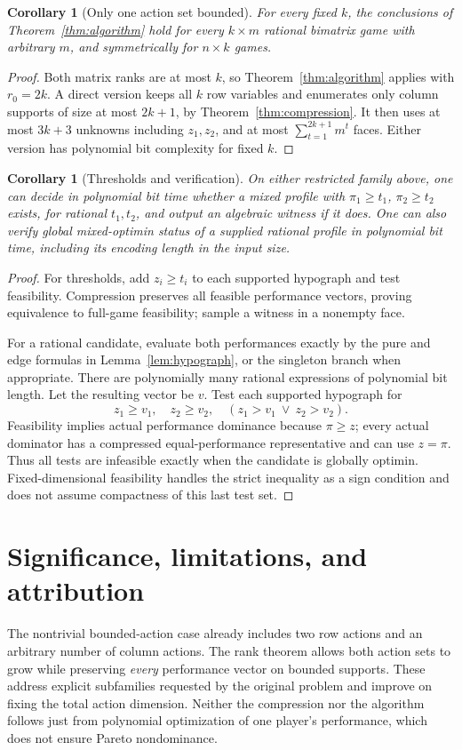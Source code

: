 \documentclass[11pt]{article}
\newtheorem{corollary}[theorem]{Corollary}
\theoremstyle{remark}
\begin{document}
\begin{corollary}[Only one action set bounded]\label{cor:one-side}
For every fixed $k$, the conclusions of Theorem~\ref{thm:algorithm} hold for every $k\times m$ rational bimatrix game with arbitrary $m$, and symmetrically for $n\times k$ games.
\end{corollary}
\begin{proof}
Both matrix ranks are at most $k$, so Theorem~\ref{thm:algorithm} applies with $r_0=2k$. A direct version keeps all $k$ row variables and enumerates only column supports of size at most $2k+1$, by Theorem~\ref{thm:compression}. It then uses at most $3k+3$ unknowns including $z_1,z_2$, and at most $\sum_{t=1}^{2k+1}m^t$ faces. Either version has polynomial bit complexity for fixed $k$.
\end{proof}

\begin{corollary}[Thresholds and verification]\label{cor:decision}
On either restricted family above, one can decide in polynomial bit time whether a mixed profile with $\pi_1\ge t_1$, $\pi_2\ge t_2$ exists, for rational $t_1,t_2$, and output an algebraic witness if it does. One can also verify global mixed-optimin status of a supplied rational profile in polynomial bit time, including its encoding length in the input size.
\end{corollary}
\begin{proof}
For thresholds, add $z_i\ge t_i$ to each supported hypograph and test feasibility. Compression preserves all feasible performance vectors, proving equivalence to full-game feasibility; sample a witness in a nonempty face.

For a rational candidate, evaluate both performances exactly by the pure and edge formulas in Lemma~\ref{lem:hypograph}, or the singleton branch when appropriate. There are polynomially many rational expressions of polynomial bit length. Let the resulting vector be $v$. Test each supported hypograph for
\[
 z_1\ge v_1,\quad z_2\ge v_2,\quad (z_1>v_1\ \vee\ z_2>v_2).
\]
Feasibility implies actual performance dominance because $\pi\ge z$; every actual dominator has a compressed equal-performance representative and can use $z=\pi$. Thus all tests are infeasible exactly when the candidate is globally optimin. Fixed-dimensional feasibility handles the strict inequality as a sign condition and does not assume compactness of this last test set.
\end{proof}

\section{Significance, limitations, and attribution}
The nontrivial bounded-action case already includes two row actions and an arbitrary number of column actions. The rank theorem allows both action sets to grow while preserving \emph{every} performance vector on bounded supports. These address explicit subfamilies requested by the original problem and improve on fixing the total action dimension. Neither the compression nor the algorithm follows just from polynomial optimization of one player's performance, which does not ensure Pareto nondominance.
\end{document}
